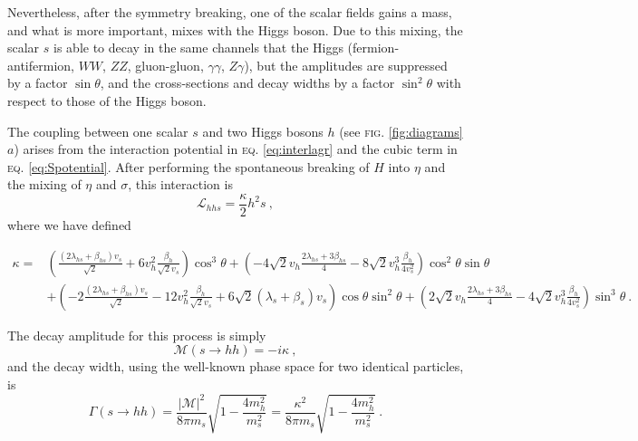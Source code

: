 \documentclass[aps,prd,preprintnumbers,nofootinbibn,twocolumn]{revtex4}
\begin{document}
Nevertheless, after the symmetry breaking, one of the scalar fields gains a mass, and what is more important, mixes with the Higgs boson. Due to this mixing, the scalar $s$ is able to decay in the same channels that the Higgs (fermion-antifermion, $WW$, $ZZ$,  gluon-gluon, $\gamma\gamma$, $Z\gamma$), but the amplitudes are suppressed by a factor $\sin \theta$, and the cross-sections and decay widths by a factor $\sin^2\theta$ with respect to those of the Higgs boson. 

The coupling between one scalar $s$ and two Higgs bosons $h$ (see \textsc{fig.} \ref{fig:diagrams}$a$) arises from the interaction potential in \textsc{eq.} \eqref{eq:interlagr} and the cubic term in \textsc{eq.} \eqref{eq:Spotential}. After performing the spontaneous breaking of $H$ into $\eta$ and the mixing of $\eta$ and $\sigma$, this interaction is
\begin{equation}
\mathcal{L}_{hhs} = \frac{\kappa}{2} h^2 s\ ,
\end{equation}
where we have defined
\begin{widetext}
\begin{align}
\kappa =& \left(\frac{(2\lambda_{hs} + \beta_{hs})v_s}{\sqrt{2}} + 6 v_h^2\frac{\beta_h}{\sqrt{2} v_s} \right)\cos^3 \theta %
+ \left(-4\sqrt{2}v_h \frac{2\lambda_{hs} + 3\beta_{hs}}{4} - 8\sqrt{2}v_h^3  \frac{\beta_h}{4 v_s^2} \right)\cos^2\theta \sin \theta \\
&+ \left(-2\frac{(2\lambda_{hs} + \beta_{hs})v_s}{\sqrt{2}} -12 v_h^2\frac{\beta_h}{\sqrt{2} v_s} +6\sqrt{2}(\lambda_s+\beta_s) v_s \right)\cos\theta \sin^2\theta %
+\left(2\sqrt{2}v_h \frac{2\lambda_{hs} + 3\beta_{hs}}{4} -4\sqrt{2}v_h^3 \frac{\beta_h}{4 v_s^2} \right)\sin^3\theta\ . \nonumber
\end{align}
\end{widetext}

The decay amplitude for this process is simply
\begin{equation}
\mathcal{M}(s\to hh)= -i \kappa\ ,
\end{equation}
and the decay width, using the well-known phase space for two identical particles, is
\begin{equation}
\Gamma(s\to hh) = \frac{|\mathcal{M}|^2}{8\pi m_s}\sqrt{1-\frac{4m_h^2}{m_s^2}} = \frac{\kappa^2}{8\pi m_s}\sqrt{1-\frac{4m_h^2}{m_s^2}}\ .
\end{equation}
\end{document}
